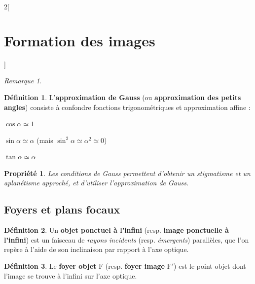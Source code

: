 \documentclass[french]{book}
\newtheorem*{propriete}{Propriété}
\theoremstyle{definition}
\newtheorem*{definition}{Définition}
\theoremstyle{remark}
\newtheorem*{remarque}{Remarque}
\newcommand*{\point}[1]{\mathrm{#1}}
\newcommand*{\tdef}[1]{\textbf{#1}}
\newcommand*{\imp}[1]{\emph{#1}}
\begin{document}
\begin{landscape}
\begin{multicols*}{2}[\section{Formation des images}]
\begin{remarque}
\begin{figure}[H]
\begin{center}
\end{center}
\end{figure}
\end{remarque}

\begin{definition}
L'\tdef{approximation de Gauss} (ou \tdef{approximation des petits angles}) consiste à confondre fonctions trigonométriques et approximation affine :

\begin{center}
\begin{itemize*}[itemjoin=\qquad]
\item $\cos \alpha \simeq 1$
\item $\sin \alpha \simeq \alpha$ (mais $\sin^2 \alpha \simeq \alpha^2 \simeq 0$)
\item $\tan \alpha \simeq \alpha$
\end{itemize*}
\end{center}
\end{definition}

\begin{propriete}
Les \imp{conditions de Gauss} permettent d'obtenir un stigmatisme et un aplanétisme approché, et d'utiliser l'approximation de Gauss.
\end{propriete}



\subsection{Foyers et plans focaux}

\begin{definition}
Un \tdef{objet ponctuel à l'infini} (resp. \tdef{image ponctuelle à l'infini}) est un faisceau de \imp{rayons incidents} (resp. \imp{émergents}) parallèles, que l'on repère à l'aide de son inclinaison par rapport à l'axe optique.
\end{definition}

\begin{definition}
Le \tdef{foyer objet} $\point{F}$ (resp. \tdef{foyer image} $\point{F'}$) est le point objet dont l'image se trouve à l'infini sur l'axe optique.
\end{definition}


\end{multicols*}
\end{landscape}
\end{document}
